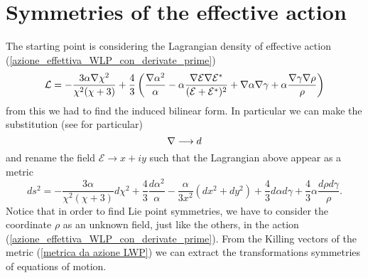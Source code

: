 \section{Symmetries of the effective action}
The starting point is considering the Lagrangian density of effective action (\ref{azione_effettiva_WLP_con_derivate_prime})
\begin{equation}
    \mathcal{L} = -\frac{3\alpha\nabla\chi^2}{\chi^2(\chi+3)}+ \frac{4}{3} \left(\frac{\nabla\alpha^2}{\alpha} -\alpha\frac{\nabla\mathcal{E}\nabla\mathcal{E}^*}{(\mathcal{E} + \mathcal{E}^*)^2} +\nabla\alpha\nabla\gamma + \alpha\frac{\nabla\gamma\nabla\rho}{\rho} \right) \notag
\end{equation}
from this we had to find the induced bilinear form. In particular we can make the substitution (see \citep{corti} for particular)
\begin{equation}
    \nabla \longrightarrow d \notag
\end{equation}
and rename the field $\mathcal{E}\rightarrow x +i y$ such that the Lagrangian above appear as a metric 
\begin{equation}
    ds^2=-\frac{3 \alpha}{\chi^2(\chi +3)}d\chi^2 + \frac{4}{3}\frac{d\alpha^2}{\alpha} - \frac{\alpha}{3x^2}(dx^2 + dy^2) +\frac{4}{3}d\alpha d\gamma +\frac{4}{3}\alpha\frac{d\rho d\gamma}{\rho}.
    \label{metrica da azione LWP}
\end{equation}
Notice that in order to find Lie point symmetries, we have to consider the coordinate $\rho$ as an unknown field, just like the others, in the action (\ref{azione_effettiva_WLP_con_derivate_prime}).
From the Killing vectors of the metric (\ref{metrica da azione LWP}) we can extract the transformations symmetries of equations of motion. 
